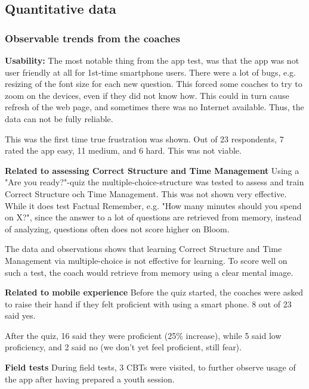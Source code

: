 \subsection{Quantitative data}


    \subsubsection{Observable trends from the coaches}

     \textbf{Usability: } The most notable thing from the app test, was that the app was not user friendly at all for 1st-time smartphone users. There were a lot of bugs, e.g. resizing of the font size for each new question. This forced some coaches to try to zoom on the devices, even if they did not know how. This could in turn cause refresh of the web page, and sometimes there was no Internet available. Thus, the data can not be fully reliable.

  This was the first time true frustration was shown. Out of 23 respondents, 7 rated the app easy, 11 medium, and 6 hard. This was not viable.

    \textbf{Related to assessing Correct Structure and Time Management}
    Using a "Are you ready?"-quiz the multiple-choice-structure was tested to assess and train Correct Structure och Time Management. This was not shown very effective. While it does test Factual Remember, e.g. "How many minutes should you spend on X?", since the answer to a lot of questions are retrieved from memory, instead of analyzing, questions often does not score higher on Bloom.

    The data and observations shows that learning Correct Structure and Time Management via multiple-choice is not effective for learning. To score well on such a test, the coach would retrieve from memory using a clear mental image.

    \textbf{Related to mobile experience}
    Before the quiz started, the coaches were asked to raise their hand if they felt proficient with using a smart phone. 8 out of 23 said yes.

    After the quiz, 16 said they were proficient (25\% increase), while 5 said low proficiency, and 2 said no (we don't yet feel proficient, still fear).

    \textbf{Field tests}
    During field tests, 3 CBTs were visited, to further observe usage of the app after having prepared a youth session.

